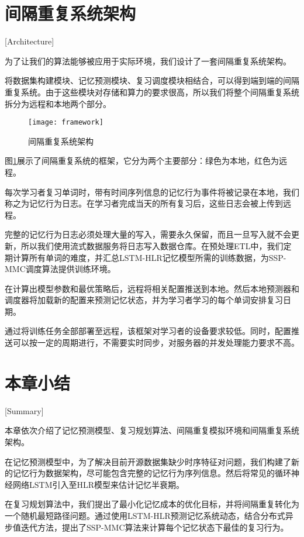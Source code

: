 \section{间隔重复系统架构}[Architecture]

为了让我们的算法能够被应用于实际环境，我们设计了一套间隔重复系统架构。

将数据集构建模块、记忆预测模块、复习调度模块相结合，可以得到端到端的间隔重复系统。由于这些模块对存储和算力的要求很高，所以我们将整个间隔重复系统拆分为远程和本地两个部分。

\begin{figure}[htbp]
\centering
\texttt{[image: framework]}
\caption{间隔重复系统架构}
\label{fig:framework}
\end{figure}

图\ref{fig:framework}展示了间隔重复系统的框架，它分为两个主要部分：绿色为本地，红色为远程。

每次学习者复习单词时，带有时间序列信息的记忆行为事件将被记录在本地，我们称之为记忆行为日志。在学习者完成当天的所有复习后，这些日志会被上传到远程。

完整的记忆行为日志必须处理大量的写入，需要永久保留，而且一旦写入就不会更新，所以我们使用流式数据服务将日志写入数据仓库。在预处理ETL中，我们定期计算所有单词的难度，并汇总LSTM-HLR记忆模型所需的训练数据，为SSP-MMC调度算法提供训练环境。

在计算出模型参数和最优策略后，远程将相关配置推送到本地。然后本地预测器和调度器将加载新的配置来预测记忆状态，并为学习者学习的每个单词安排复习日期。

通过将训练任务全部部署至远程，该框架对学习者的设备要求较低。同时，配置推送可以按一定的周期进行，不需要实时同步，对服务器的并发处理能力要求不高。

\section{本章小结}[Summary]

本章依次介绍了记忆预测模型、复习规划算法、间隔重复模拟环境和间隔重复系统架构。

在记忆预测模型中，为了解决目前开源数据集缺少时序特征对问题，我们构建了新的记忆行为数据架构，尽可能包含完整的记忆行为序列信息。然后将常见的循环神经网络LSTM引入至HLR模型来估计记忆半衰期。

在复习规划算法中，我们提出了最小化记忆成本的优化目标，并将间隔重复转化为一个随机最短路径问题。通过使用LSTM-HLR预测记忆系统动态，结合分布式异步值迭代方法，提出了SSP-MMC算法来计算每个记忆状态下最佳的复习行为。

